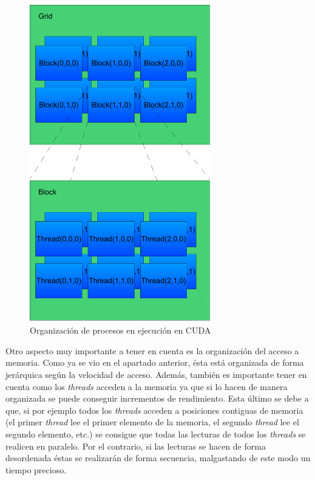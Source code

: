 \begin{figure}
	\centering
	\includegraphics[width=0.7\textwidth]{images/cuda_org.pdf}
	\caption{Organización de procesos en ejecución en CUDA}\label{fig:cudaorg}
\end{figure}

Otro aspecto muy importante a tener en cuenta es la organización del acceso a memoria. Como ya se vio en el apartado anterior, ésta está organizada de forma jerárquica según la velocidad de acceso. Además, también es importante tener en cuenta como los \emph{threads} acceden a la memoria ya que si lo hacen de manera organizada se puede conseguir incrementos de rendimiento. Esta último se debe a que, si por ejemplo todos los \emph{threads} acceden a posiciones contiguas de memoria (el primer \emph{thread} lee el primer elemento de la memoria, el segundo \emph{thread} lee el segundo elemento, etc.) se consigue que todas las lecturas de todos los \emph{threads} se realicen en paralelo. Por el contrario, si las lecturas se hacen de forma desordenada éstas se realizarán de forma secuencia, malgastando de este modo un tiempo precioso.
 
